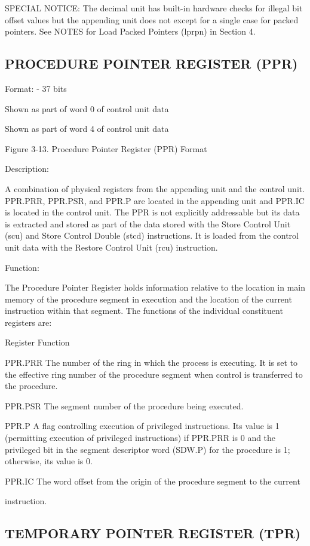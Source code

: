 SPECIAL NOTICE: The decimal unit has built-in hardware checks for illegal bit
offset values but the appending unit does not except for a single case for
packed pointers. See NOTES for Load Packed Pointers (lprpn) in Section 4.

\subsection{PROCEDURE POINTER REGISTER (PPR)}

Format: - 37 bits

Shown as part of word 0 of control unit data

Shown as part of word 4 of control unit data

Figure 3-13. Procedure Pointer Register (PPR) Format

Description:

A combination of physical registers from the appending unit and the control
unit. PPR.PRR, PPR.PSR, and PPR.P are located in the appending unit and PPR.IC
is located in the control unit. The PPR is not explicitly addressable but its
data is extracted and stored as part of the data stored with the Store Control
Unit (scu) and Store Control Double (stcd) instructions.  It is loaded from the
control unit data with the Restore Control Unit (rcu) instruction.

Function:

The Procedure Pointer Register holds information relative to the location in
main memory of the procedure segment in execution and the location of the
current instruction within that segment. The functions of the individual
constituent registers are:

Register Function

PPR.PRR The number of the ring in which the process is executing. It is set to
the effective ring number of the procedure segment when control is transferred
to the procedure.

PPR.PSR The segment number of the procedure being executed.

PPR.P A flag controlling execution of privileged instructions.  Its value is 1
(permitting execution of privileged instructions) if PPR.PRR is 0 and the
privileged bit in the segment descriptor word (SDW.P) for the procedure is 1;
otherwise, its value is 0.

PPR.IC The word offset from the origin of the procedure segment to the current

instruction.
\subsection{TEMPORARY POINTER REGISTER (TPR)}

